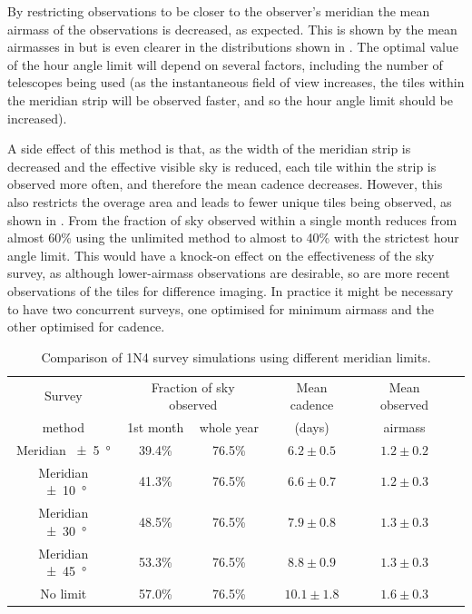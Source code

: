 \begin{colsection}
\begin{colsection}
By restricting observations to be closer to the observer's meridian the mean airmass of the observations is decreased, as expected. This is shown by the mean airmasses in  but is even clearer in the distributions shown in . The optimal value of the hour angle limit will depend on several factors, including the number of telescopes being used (as the instantaneous field of view increases, the tiles within the meridian strip will be observed faster, and so the hour angle limit should be increased).

A side effect of this method is that, as the width of the meridian strip is decreased and the effective visible sky is reduced, each tile within the strip is observed more often, and therefore the mean cadence decreases. However, this also restricts the overage area and leads to fewer unique tiles being observed, as shown in . From  the fraction of sky observed within a single month reduces from almost 60\% using the unlimited method to almost to 40\% with the strictest hour angle limit. This would have a knock-on effect on the effectiveness of the sky survey, as although lower-airmass observations are desirable, so are more recent observations of the tiles for difference imaging. In practice it might be necessary to have two concurrent surveys, one optimised for minimum airmass and the other optimised for cadence.

\begin{table}[t]
    \begin{center}
        \begin{tabular}{c|cc|c|c|c} %
            Survey &
            \multicolumn{2}{c|}{Fraction of sky observed} &
            Mean cadence &
            Mean observed
            \\
            method &
            1st month &
            whole year &
            (days) &
            airmass
            \\
            \midrule
            Meridian  \SI{\pm5}{\degree} & 39.4\% & 76.5\% &  $6.2\pm0.5$ & $1.2\pm0.2$ \\
            Meridian \SI{\pm10}{\degree} & 41.3\% & 76.5\% &  $6.6\pm0.7$ & $1.2\pm0.3$ \\
            Meridian \SI{\pm30}{\degree} & 48.5\% & 76.5\% &  $7.9\pm0.8$ & $1.3\pm0.3$ \\
            Meridian \SI{\pm45}{\degree} & 53.3\% & 76.5\% &  $8.8\pm0.9$ & $1.3\pm0.3$ \\
            No limit                     & 57.0\% & 76.5\% & $10.1\pm1.8$ & $1.6\pm0.3$ \\
        \end{tabular}
    \end{center}
    \caption[Comparison of survey simulations using a meridian limit]{
        Comparison of 1N4 survey simulations using different meridian limits.
    }\label{tab:survey_sim_meridian}
\end{table}


\end{colsection}
\end{colsection}
